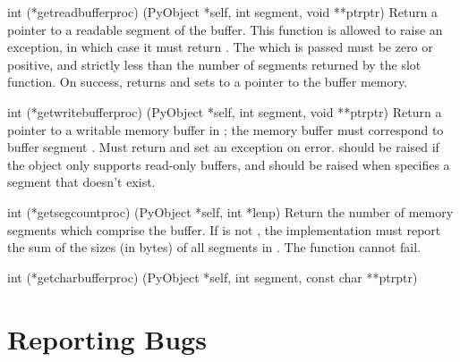 \documentclass{manual}
\begin{document}
\begin{ctypedesc}[getreadbufferproc]{int (*getreadbufferproc)
                            (PyObject *self, int segment, void **ptrptr)}
Return a pointer to a readable segment of the buffer.  This function
is allowed to raise an exception, in which case it must return
.  The  which is passed must be zero or
positive, and strictly less than the number of segments returned by
the  slot function.  On success, returns
 and sets  to a pointer to the buffer
memory.
\end{ctypedesc}

\begin{ctypedesc}[getwritebufferproc]{int (*getwritebufferproc)
                            (PyObject *self, int segment, void **ptrptr)}
Return a pointer to a writable memory buffer in ;
the memory buffer must correspond to buffer segment .
Must return  and set an exception on error.
 should be raised if the object only supports
read-only buffers, and  should be raised when
 specifies a segment that doesn't exist.
\end{ctypedesc}

\begin{ctypedesc}[getsegcountproc]{int (*getsegcountproc)
                            (PyObject *self, int *lenp)}
Return the number of memory segments which comprise the buffer.  If
 is not \NULL, the implementation must report the sum of the 
sizes (in bytes) of all segments in .
The function cannot fail.
\end{ctypedesc}

\begin{ctypedesc}[getcharbufferproc]{int (*getcharbufferproc)
                            (PyObject *self, int segment, const char **ptrptr)}
\end{ctypedesc}


%


\appendix
\chapter{Reporting Bugs}


\end{document}
